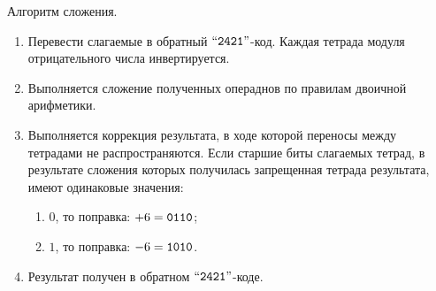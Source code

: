 Алгоритм сложения.
    
\begin{enumerate}
    \item Перевести слагаемые в обратный $\text{``\texttt{2421}''}$-код. Каждая тетрада модуля отрицательного числа инвертируется.
    \item Выполняется сложение полученных операднов по правилам двоичной арифметики.
    \item Выполняется коррекция результата, в ходе которой переносы между тетрадами не распространяются. 
    Если старшие биты слагаемых тетрад, в результате сложения которых получилась запрещенная тетрада результата, имеют одинаковые значения:
    \begin{enumerate}
        \item $0$, то поправка: $+6=\texttt{0110}$;
        \item $1$, то поправка: $-6=\texttt{1010}$.
    \end{enumerate}
    \item Результат получен в обратном $\text{``\texttt{2421}''}$-коде.
\end{enumerate}

